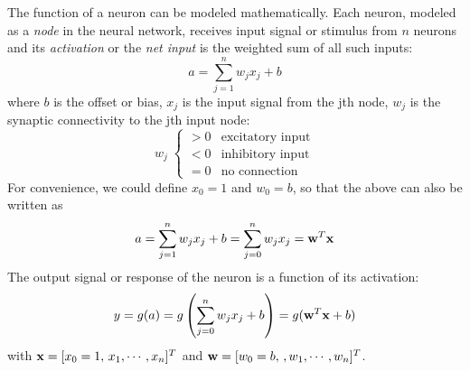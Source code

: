 \documentclass{article}
\begin{document}
The function of a neuron can be modeled mathematically. Each neuron,
modeled as a {\em node} in the neural network, receives input signal
or stimulus from $n$ neurons and its {\em activation} or the 
{\em net input} is the weighted sum of all such inputs:
\begin{equation}
  a=\sum_{j=1}^n w_j x_j+b
\end{equation}
where $b$ is the offset or bias, $x_j$ is the input signal from the jth
node, $w_j$ is the synaptic connectivity to the jth input node:
\begin{equation}
  w_j\;\left\{ \begin{array}{ll}
    > 0	& \mbox{excitatory input}	\\
    < 0	& \mbox{inhibitory input}	\\
    = 0	& \mbox{no connection}
  \end{array} \right.
\end{equation}
For convenience, we could define $x_0=1$ and $w_0=b$, so that the above 
can also be written as
\begin{equation}
  a=\sum_{j=1}^n w_j x_j+b=\sum_{j=0}^n w_j x_j={\bf w}^T{\bf x}
\end{equation}
The output signal or response of the neuron is a function of its
activation:
\begin{equation} 	
  y=g(a)=g\left(\sum_{j=0}^n w_j x_j+b\right)=g({\bf w}^T{\bf x}+b)
\end{equation}
with ${\bf x}=[x_0=1,\,x_1,\cdots,x_n]^T$ and ${\bf w}=[w_0=b,\,,w_1,\cdots,w_n]^T$.

\end{document}
